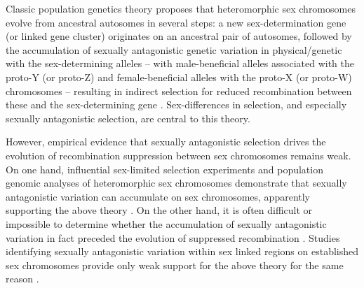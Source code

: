 \documentclass{article}[12pt]
\begin{document}
Classic population genetics theory proposes that heteromorphic sex chromosomes evolve from ancestral autosomes in several steps: a new sex-determination gene (or linked gene cluster) originates on an ancestral pair of autosomes, followed by the accumulation of sexually antagonistic genetic variation in physical/genetic with the sex-determining alleles -- with male-beneficial alleles associated with the proto-Y (or proto-Z) and female-beneficial alleles with the proto-X (or proto-W) chromosomes -- resulting in indirect selection for reduced recombination between these and the sex-determining gene \citep{Fisher1931, Nei1969, Charlesworth1980, Bull1983, Rice1987, Lenormand2003, CharlesworthMarais2005}. Sex-differences in selection, and especially sexually antagonistic selection, are central to this theory. %

However, empirical evidence that sexually antagonistic selection drives the evolution of recombination suppression between sex chromosomes remains weak. On one hand, influential sex-limited selection experiments and population genomic analyses of heteromorphic sex chromosomes demonstrate that sexually antagonistic variation can accumulate on sex chromosomes, apparently supporting the above theory \cite[e.g.,][]{Rice1992,Chippindale2001,Gibson2002, ZhouBachtrog2012,QiuBergeroCharlesworth2013}. On the other hand, it is often difficult or impossible to determine whether the accumulation of sexually antagonistic variation in fact preceded the evolution of suppressed recombination \citep{Charlesworth1980, Rice1984, Ironside2010, Ponnikas2018}. Studies identifying sexually antagonistic variation within sex linked regions on established sex chromosomes provide only weak support for the above theory for the same reason \cite[e.g.][]{BergeroCharlesworth2009,QiuBergeroCharlesworth2013,KirkpatrickGuerrero2014, Wright2017, BergeroCharlesworth2019}.
\end{document}
